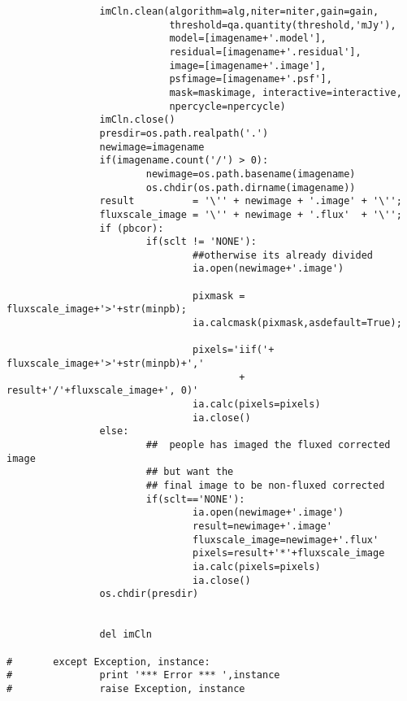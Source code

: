 \begin{verbatim}
                imCln.clean(algorithm=alg,niter=niter,gain=gain,
                            threshold=qa.quantity(threshold,'mJy'),
                            model=[imagename+'.model'],
                            residual=[imagename+'.residual'],
                            image=[imagename+'.image'], 
                            psfimage=[imagename+'.psf'], 
                            mask=maskimage, interactive=interactive, 
                            npercycle=npercycle)
                imCln.close()
                presdir=os.path.realpath('.')
                newimage=imagename
                if(imagename.count('/') > 0):
                        newimage=os.path.basename(imagename)
                        os.chdir(os.path.dirname(imagename))
                result          = '\'' + newimage + '.image' + '\'';
                fluxscale_image = '\'' + newimage + '.flux'  + '\'';
                if (pbcor):
                        if(sclt != 'NONE'):
                                ##otherwise its already divided
                                ia.open(newimage+'.image')
                                
                                pixmask = fluxscale_image+'>'+str(minpb);
                                ia.calcmask(pixmask,asdefault=True);

                                pixels='iif('+ fluxscale_image+'>'+str(minpb)+','
                                        + result+'/'+fluxscale_image+', 0)'
                                ia.calc(pixels=pixels)
                                ia.close()
                else:
                        ##  people has imaged the fluxed corrected image
                        ## but want the
                        ## final image to be non-fluxed corrected
                        if(sclt=='NONE'):
                                ia.open(newimage+'.image')
                                result=newimage+'.image'
                                fluxscale_image=newimage+'.flux'
                                pixels=result+'*'+fluxscale_image
                                ia.calc(pixels=pixels)
                                ia.close()
                os.chdir(presdir)

                
                del imCln

#       except Exception, instance:
#               print '*** Error *** ',instance
#               raise Exception, instance

\end{verbatim}

